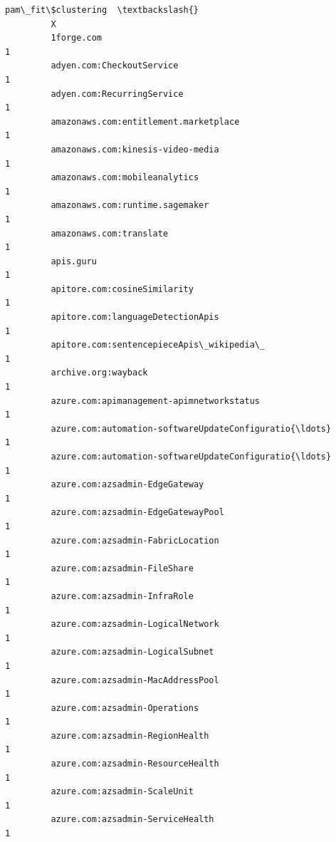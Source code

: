 \documentclass[11pt]{article}
\begin{document}
\begin{Verbatim}[commandchars=\\\{\}]
                                                             pam\_fit\$clustering  \textbackslash{}
         X                                                                        
         1forge.com                                                           1   
         adyen.com:CheckoutService                                            1   
         adyen.com:RecurringService                                           1   
         amazonaws.com:entitlement.marketplace                                1   
         amazonaws.com:kinesis-video-media                                    1   
         amazonaws.com:mobileanalytics                                        1   
         amazonaws.com:runtime.sagemaker                                      1   
         amazonaws.com:translate                                              1   
         apis.guru                                                            1   
         apitore.com:cosineSimilarity                                         1   
         apitore.com:languageDetectionApis                                    1   
         apitore.com:sentencepieceApis\_wikipedia\_                             1   
         archive.org:wayback                                                  1   
         azure.com:apimanagement-apimnetworkstatus                            1   
         azure.com:automation-softwareUpdateConfiguratio{\ldots}                   1   
         azure.com:automation-softwareUpdateConfiguratio{\ldots}                   1   
         azure.com:azsadmin-EdgeGateway                                       1   
         azure.com:azsadmin-EdgeGatewayPool                                   1   
         azure.com:azsadmin-FabricLocation                                    1   
         azure.com:azsadmin-FileShare                                         1   
         azure.com:azsadmin-InfraRole                                         1   
         azure.com:azsadmin-LogicalNetwork                                    1   
         azure.com:azsadmin-LogicalSubnet                                     1   
         azure.com:azsadmin-MacAddressPool                                    1   
         azure.com:azsadmin-Operations                                        1   
         azure.com:azsadmin-RegionHealth                                      1   
         azure.com:azsadmin-ResourceHealth                                    1   
         azure.com:azsadmin-ScaleUnit                                         1   
         azure.com:azsadmin-ServiceHealth                                     1   

\end{Verbatim}
\end{document}
